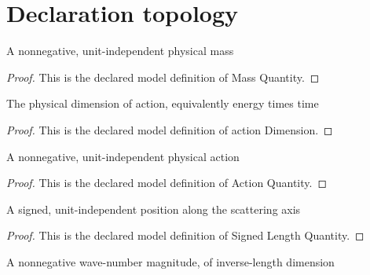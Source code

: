 \section{Declaration topology}
\begin{definition}
  \label{def:physics:phyx-mini-0600:phyxminiproblems-problemphyxmini0600-massquantity}
  A nonnegative, unit-independent physical mass
\end{definition}
\begin{proof}
  This is the declared model definition of Mass Quantity.
\end{proof}
\begin{definition}
  \label{def:physics:phyx-mini-0600:phyxminiproblems-problemphyxmini0600-actiondimension}
  The physical dimension of action, equivalently energy times time
\end{definition}
\begin{proof}
  This is the declared model definition of action Dimension.
\end{proof}
\begin{definition}
  \label{def:physics:phyx-mini-0600:phyxminiproblems-problemphyxmini0600-actionquantity}
  A nonnegative, unit-independent physical action
\end{definition}
\begin{proof}
  This is the declared model definition of Action Quantity.
\end{proof}
\begin{definition}
  \label{def:physics:phyx-mini-0600:phyxminiproblems-problemphyxmini0600-signedlengthquantity}
  A signed, unit-independent position along the scattering axis
\end{definition}
\begin{proof}
  This is the declared model definition of Signed Length Quantity.
\end{proof}
\begin{definition}
  \label{def:physics:phyx-mini-0600:phyxminiproblems-problemphyxmini0600-wavenumberquantity}
  A nonnegative wave-number magnitude, of inverse-length dimension
\end{definition}
